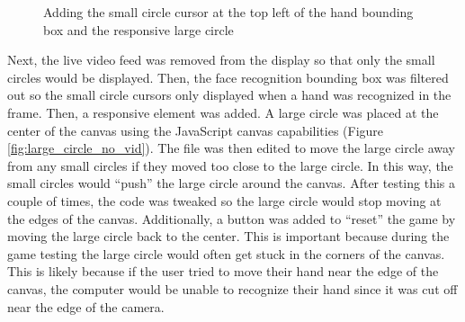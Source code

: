 \documentclass[10pt,twocolumn]{article}
\begin{document}
\begin{figure}[hbh]
\begin{center}
\vspace{.5cm}
\caption{Adding the small circle cursor at the top left of the hand bounding box and the responsive large circle}
\label{fig:large_circle}
\end{center}
\end{figure}

Next, the live video feed was removed from the display so that only the small circles would be displayed. Then, the face recognition bounding box was filtered out so the small circle cursors only displayed when a hand was recognized in the frame.  Then, a responsive element was added. A large circle was placed at the center of the canvas using the JavaScript canvas capabilities (Figure \ref{fig:large_circle_no_vid}).  The file was then edited to move the large circle away from any small circles if they moved too close to the large circle.  In this way, the small circles would ``push'' the large circle around the canvas.  After testing this a couple of times, the code was tweaked so the large circle would stop moving at the edges of the canvas. Additionally, a button was added to ``reset'' the game by moving the large circle back to the center.  This is important because during the game testing the large circle would often get stuck in the corners of the canvas. This is likely because if the user tried to move their hand near the edge of the canvas, the computer would be unable to recognize their hand since it was cut off near the edge of the camera.  
\end{document}
